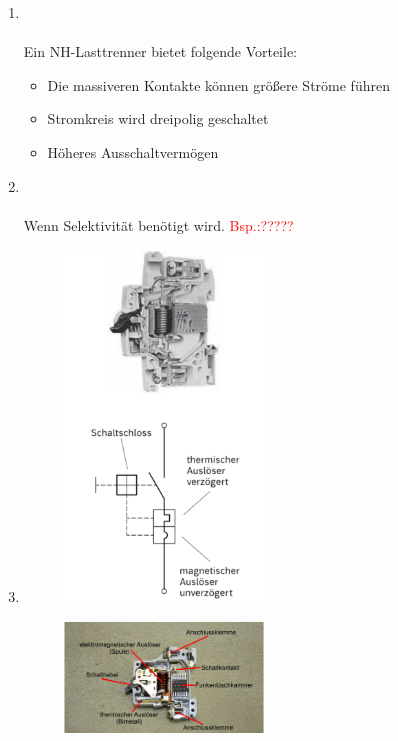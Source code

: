 \begin{enumerate}
    \item   {} \\\\
            Ein NH-Lasttrenner bietet folgende Vorteile:
            \begin{itemize}
                \item Die massiveren Kontakte können größere Ströme führen
                \item Stromkreis wird dreipolig geschaltet
                \item Höheres Ausschaltvermögen
            \end{itemize}      

    \item   {}\\\\
            Wenn Selektivität benötigt wird. \textcolor{red}{Bsp.:?????}


    \item   {}
            \clearpage
            \begin{figure}[!htp]
                \centering
                \includegraphics[width = 0.5\textwidth]{img/LSS_Aufbau.png}
            \end{figure}
            \begin{figure}[!htp]
                \centering
                \includegraphics[width = 0.5\textwidth]{img/Leitungsschutzschalter.PNG}
            \end{figure}


\end{enumerate}
